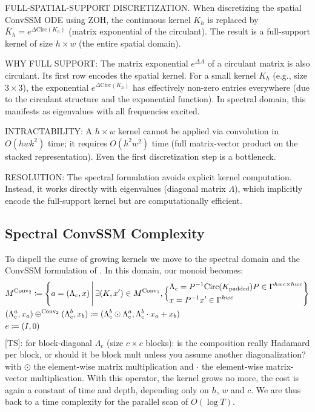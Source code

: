\documentclass{article}
\newcommand{\TS}[1]{{\color{pink}[TS]: #1}}
\begin{document}
\begin{thomasbox}
FULL-SPATIAL-SUPPORT DISCRETIZATION. When discretizing the spatial ConvSSM ODE using ZOH, the continuous kernel $K_h$ is replaced by $\overline{K}_h = e^{\Delta \mathrm{Circ}(K_h)}$ (matrix exponential of the circulant). The result is a full-support kernel of size $h \times w$ (the entire spatial domain).

WHY FULL SUPPORT: The matrix exponential $e^{\Delta A}$ of a circulant matrix is also circulant. Its first row encodes the spatial kernel. For a small kernel $K_h$ (e.g., size $3 \times 3$), the exponential $e^{\Delta \mathrm{Circ}(K_h)}$ has effectively non-zero entries everywhere (due to the circulant structure and the exponential function). In spectral domain, this manifests as eigenvalues with all frequencies excited.

INTRACTABILITY: A $h \times w$ kernel cannot be applied via convolution in $O(hwk^2)$ time; it requires $O(h^2 w^2)$ time (full matrix-vector product on the stacked representation). Even the first discretization step is a bottleneck.

RESOLUTION: The spectral formulation avoids explicit kernel computation. Instead, it works directly with eigenvalues (diagonal matrix $\Lambda$), which implicitly encode the full-support kernel but are computationally efficient.
\end{thomasbox}

\subsection{Spectral ConvSSM Complexity}
\label{app:Spectral_ConvSSM_complexity}

To dispell the curse of growing kernels we move to the spectral domain and the ConvSSM formulation of . In this domain, our monoid becomes:
\begin{align}
\label{eq:M_SSM_spectral}
    &M^{\mathrm{Conv}_2}\coloneqq \left\{ a = (\Lambda_c, x)\,\middle|\,\exists (K, x')\in M^{\mathrm{Conv}_1},\Bigl\{\begin{aligned}
    &\Lambda_c = P^{-1} \mathrm{Circ}(K_{\mathrm{padded}}) P \in \Gamma^{hwc \times hwc}\\
    &x = P^{-1} x' \in \Gamma^{h w c}
\end{aligned}
\Bigr.\right\}\\
\label{eq:+_SSM_spectral}
    &(\Lambda^a_c, x_a) \oplus^{\mathrm{Conv}_2} (\Lambda^b_c, x_b)\coloneqq (\Lambda^b_c \odot \Lambda^a_c, \Lambda^b_c \cdot x_a + x_b)\\
\label{eq:0_SSM_spectral}
    &e\coloneqq(I, 0)
\end{align}
\TS{for block-diagonal $\Lambda_c$ (size $c\times c$ blocks): is the composition really Hadamard per block, or should it be block mult unless you assume another diagonalization?}
\noindent with $\odot$ the element-wise matrix multiplication and $\cdot$ the element-wise matrix-vector multiplication. With this operator, the kernel grows no more, the cost is again a constant of time and depth, depending only on $h$, $w$ and $c$. We are thus back to a time complexity for the parallel scan of $O(\log T)$.
\end{document}
